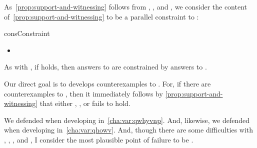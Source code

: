 \begin{note}
  As~\autoref{prop:support-and-witnessing} follows from \linkW{}, \linkH{}, and \issueInclusion{}, we consider the content of~\autoref{prop:support-and-witnessing} to be a parallel constraint to \issueInclusion{}:

  \begin{constraint}{consConstraint}{\issueConstraint{}}
    \medskip
    \begin{itemize}
    \item
    \end{itemize}
    \vspace{-\baselineskip}
  \end{constraint}

  As with \issueInclusion{}, if \issueConstraint{} holds, then answers to \qWhyV{} are constrained by answers to \qHowV{}.

  Our direct goal is to develops counterexamples to \issueConstraint{}.
  For, if there are counterexamples to \issueConstraint{}, then it immediately follows by \autoref{prop:support-and-witnessing} that either \linkW{}, \linkH{}, or \issueInclusion{} fails to hold.

  We defended \linkW{} when developing \qWhyV{} in~\autoref{cha:var:qwhyvnp}.
  And, likewise, we defended \linkH{} when developing \qHowV{} in~\autoref{cha:var:qhowv}.
  And, though there are some difficulties with \qWhyV{}, \qHowV{}, \linkW{}, and \linkH{}, I consider the most plausible point of failure to be \issueInclusion{}.
\end{note}




